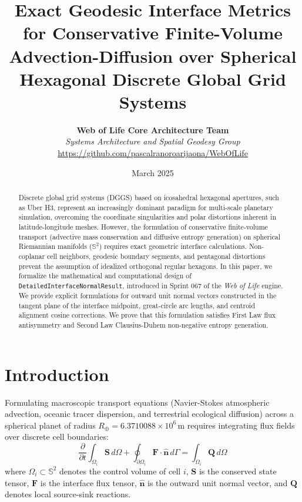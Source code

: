 \documentclass[11pt,a4paper]{article}
\title{\textbf{Exact Geodesic Interface Metrics for Conservative Finite-Volume Advection-Diffusion over Spherical Hexagonal Discrete Global Grid Systems}}
\author{\textbf{Web of Life Core Architecture Team} \\
\textit{Systems Architecture and Spatial Geodesy Group} \\
\url{https://github.com/pascalranoroarijaona/WebOfLife}}
\date{March 2025}
\begin{document}
\maketitle

\begin{abstract}
Discrete global grid systems (DGGS) based on icosahedral hexagonal apertures, such as Uber H3, represent an increasingly dominant paradigm for multi-scale planetary simulation, overcoming the coordinate singularities and polar distortions inherent in latitude-longitude meshes. However, the formulation of conservative finite-volume transport (advective mass conservation and diffusive entropy generation) on spherical Riemannian manifolds ($\mathbb{S}^2$) requires exact geometric interface calculations. Non-coplanar cell neighbors, geodesic boundary segments, and pentagonal distortions prevent the assumption of idealized orthogonal regular hexagons. In this paper, we formalize the mathematical and computational design of \texttt{DetailedInterfaceNormalResult}, introduced in Sprint 067 of the \textit{Web of Life} engine. We provide explicit formulations for outward unit normal vectors constructed in the tangent plane of the interface midpoint, great-circle arc lengths, and centroid alignment cosine corrections. We prove that this formulation satisfies First Law flux antisymmetry and Second Law Clausius-Duhem non-negative entropy generation.
\end{abstract}

\section{Introduction}

Formulating macroscopic transport equations (Navier-Stokes atmospheric advection, oceanic tracer dispersion, and terrestrial ecological diffusion) across a spherical planet of radius $R_{\oplus} = 6.3710088 \times 10^6\,\text{m}$ requires integrating flux fields over discrete cell boundaries:
\begin{equation}
  \frac{\partial}{\partial t} \int_{\Omega_i} \mathbf{S} \, d\Omega + \oint_{\partial \Omega_i} \mathbf{F} \cdot \hat{\mathbf{n}} \, d\Gamma = \int_{\Omega_i} \mathbf{Q} \, d\Omega
\end{equation}
where $\Omega_i \subset \mathbb{S}^2$ denotes the control volume of cell $i$, $\mathbf{S}$ is the conserved state tensor, $\mathbf{F}$ is the interface flux tensor, $\hat{\mathbf{n}}$ is the outward unit normal vector, and $\mathbf{Q}$ denotes local source-sink reactions.
\end{document}
